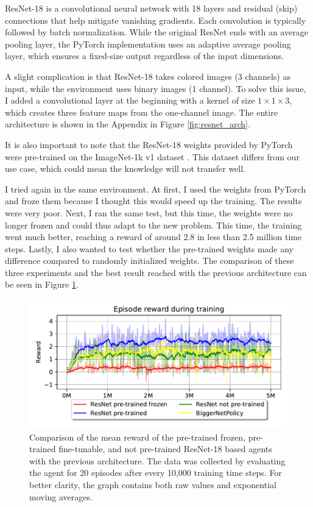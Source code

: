 \documentclass[
  digital,     %
  oneside,     %
  nosansbold,  %
  nocolorbold, %
  lof,         %
  lot,         %
]{fithesis4}
\begin{document}
ResNet-18 is a convolutional neural network with 18 layers and residual (skip) connections that help mitigate vanishing gradients. Each convolution is typically followed by batch normalization. While the original ResNet ends with an average pooling layer, the PyTorch implementation uses an adaptive average pooling layer, which ensures a fixed-size output regardless of the input dimensions.

A slight complication is that ResNet-18 takes colored images (3 channels) as input, while the environment uses binary images (1 channel). To solve this issue, I added a convolutional layer at the beginning with a kernel of size $1\times1\times3$, which creates three feature maps from the one-channel image. The entire architecture is shown in the Appendix in Figure \ref{fig:resnet_arch}.

It is also important to note that the ResNet-18 weights provided by PyTorch were pre-trained on the ImageNet-1k v1 dataset \cite{torchvision2016}. This dataset differs from our use case, which could mean the knowledge will not transfer well.

I tried again in the same environment. At first, I used the weights from PyTorch and froze them because I thought this would speed up the training. The results were very poor. Next, I ran the same test, but this time, the weights were no longer frozen and could thus adapt to the new problem. This time, the training went much better, reaching a reward of around 2.8 in less than 2.5 million time steps. Lastly, I also wanted to test whether the pre-trained weights made any difference compared to randomly initialized weights. The comparison of these three experiments and the best result reached with the previous architecture can be seen in Figure \ref{fig:v4_resnet_graph}. 

\begin{figure}
    \includegraphics[width=1\linewidth]{graphs/v4_resnet_graph.pdf}
    \caption{Comparison of the mean reward of the pre-trained frozen, pre-trained fine-tunable, and not pre-trained ResNet-18 based agents with the previous architecture. The data was collected by evaluating the agent for 20 episodes after every 10,000 training time steps. For better clarity, the graph contains both raw values and exponential moving averages.}
    \label{fig:v4_resnet_graph}
\end{figure}
\end{document}
